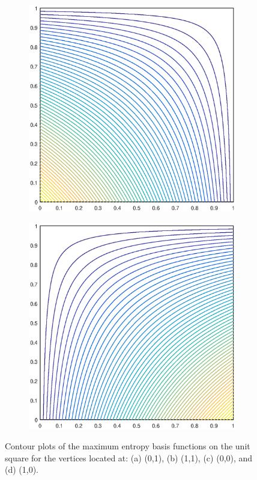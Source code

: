 \begin{figure}
\begin{subfigure}[b]{0.35\textwidth}
		\caption{}
	\end{subfigure}
	\vfill
	\begin{subfigure}[b]{0.35\textwidth}
		\centering
		\includegraphics[width=\textwidth]{figures/sec_BF/square_MAXENT1_contour_b1.eps}
		\caption{}
	\end{subfigure}
	\hspace{1cm}
	\begin{subfigure}[b]{0.35\textwidth}
		\centering
		\includegraphics[width=\textwidth]{figures/sec_BF/square_MAXENT1_contour_b2.eps}
		\caption{}
	\end{subfigure}
\caption{Contour plots of the maximum entropy basis functions on the unit square for the vertices located at: (a) (0,1), (b) (1,1), (c) (0,0), and (d) (1,0).}
\end{figure}

